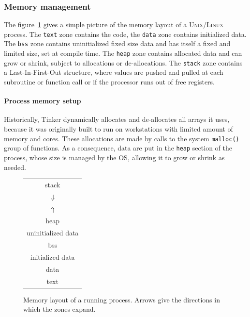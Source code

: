 \documentclass[9pt,comparison]{livecoms}
\newcommand{\lv}{\Large\verb}
\begin{document}
\subsubsection{Memory management}
\hspace{\parindent}The figure~\ref{fig:Program_layout} gives a simple picture of the memory layout of a \textsc{Unix/Linux} process. The {\color{codepurple}\lv|text|} zone contains the code, the {\color{codepurple}\lv|data|} zone contains initialized data.  The {\color{codepurple}\lv|bss|} zone contains uninitialized fixed size data and has itself a fixed and limited size, set at compile time. The {\color{codepurple}\lv|heap|} zone contains allocated data and can grow or shrink, subject to allocations or de-allocations. The {\color{codepurple}\lv|stack|} zone contains a Last-In-First-Out structure, where values are pushed and pulled at each subroutine or function call or if the processor runs out of free registers.
\paragraph{\normalsize Process memory setup}
\hspace{\parindent}Historically, Tinker dynamically allocates and de-allocates all arrays it uses, because it was originally built to run on workstations with limited amount of memory and cores. These allocations are made by calls to the system {\color{codegreen}\lv|malloc()|} group of functions. As a consequence, data are put in the {\color{codepurple}\lv|heap|} section of the process, whose size is managed by the OS, allowing it to grow or shrink as needed.
\begin{figure}[htbp!]
    \centering
    \begin{tabular}{|c|}
         \hline
         {\color{codepurple} stack} \\
         \hdashline
         \color{codepurple}$\Downarrow$ \\
         \color{codepurple}$\Uparrow$\\
         \hdashline
         {\color{codepurple} heap}\\
         \hline
         uninitialized data\\
         {\color{codepurple}bss}\\
         \hline
         initialized data\\
         {\color{codepurple} data}\\
         \hline
         {\color{codepurple} text}\\
         \hline
    \end{tabular}
    \caption{Memory layout of a running process. Arrows give the directions in which the zones expand.}
\label{fig:Program_layout}
\end{figure}
\end{document}
